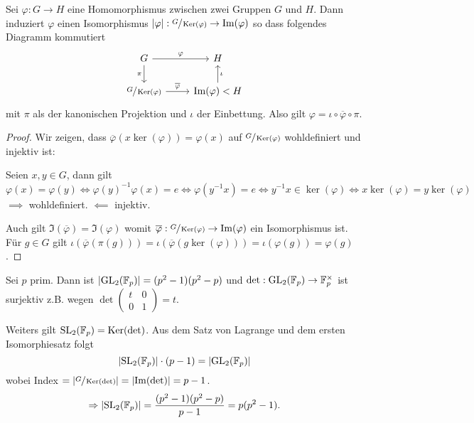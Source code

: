 \begin{theorem}
	Sei $\varphi: G \to H$ eine Homomorphismus zwischen zwei Gruppen $G$ und $H$.
	Dann induziert $\varphi$ einen Isomorphismus $\abs{\varphi}: \sfrac{G}{\operatorname{Ker}(\varphi)} \to  \Im(\varphi)$ so dass 
	folgendes Diagramm kommutiert
	\[
	\begin{tikzcd}
		G \arrow[d, "\pi"'] \arrow[r, "\varphi"]                 & H                                    \\
	\sfrac{G}{\ker(\varphi)} \arrow[r, "\overline{\varphi}"] & \Im(\varphi) < H \arrow[u, "\iota"']
		\end{tikzcd}
	\] 
	mit $\pi$ als der kanonischen Projektion und $\iota$ der Einbettung.
	Also gilt $\varphi = \iota \circ \overline{\varphi} \circ \pi$.
\end{theorem}

\begin{proof}
	Wir zeigen, dass $\overline{\varphi}(x \ker(\varphi)) = \varphi(x)$ auf $\sfrac{G}{\operatorname{Ker}(\varphi)}$ wohldefiniert und injektiv ist:

	Seien $x,y \in G$, dann gilt 
	\[
		\varphi(x) = \varphi(y) \Leftrightarrow \varphi(y)^{-1} \varphi(x) = e \Leftrightarrow \varphi(y^{-1} x) = e \Leftrightarrow y^{-1} x \in \ker(\varphi) \Leftrightarrow
		x \ker(\varphi) = y \ker(\varphi)
	\]
	$\implies$ wohldefiniert. $\impliedby$ injektiv.

	Auch gilt $\Im(\overline{\varphi}) = \Im(\varphi)$ womit $\overline{\varphi}: \sfrac{G}{\operatorname{Ker}(\varphi)} \to \Im(\varphi)$ ein Isomorphismus ist.
	Für $g \in G$ gilt $\iota(\overline{\varphi}(\pi(g))) = \iota(\overline{\varphi}(g \ker(\varphi))) = \iota(\varphi(g)) = \varphi(g)$.
\end{proof}

\begin{eg}
	Sei $p$ prim. Dann ist $\abs{\operatorname{GL}_{2}(\mathbb{F}_{p})} = (p^2 -1)(p^2 - p)$ und 
	$\det: \operatorname{GL}_{2}(\mathbb{F}_{p}) \to \mathbb{F}_{p}^{\times}$ ist surjektiv z.B. wegen $\det\begin{pmatrix} 
		t & 0\\ 0 & 1
	\end{pmatrix} = t$. 

	Weiters gilt $\operatorname{SL}_2(\mathbb{F}_{p}) = \operatorname{Ker}(\det)$. Aus dem Satz von Lagrange und dem ersten Isomorphiesatz folgt
	\[
		\abs{\operatorname{SL}_2(\mathbb{F}_{p})} \cdot (p-1) = \abs{\operatorname{GL}_2(\mathbb{F}_{p})}
	\]
	wobei Index $= \abs{\sfrac{G}{\operatorname{Ker}(\det)}} = \abs{\Im(\det)} = p-1$.
	\[
		\Rightarrow \abs{\operatorname{SL}_2(\mathbb{F}_{p})} = \frac{(p^2-1)(p^2-p)}{p-1} = p (p^2-1)
	.\] 
\end{eg}

